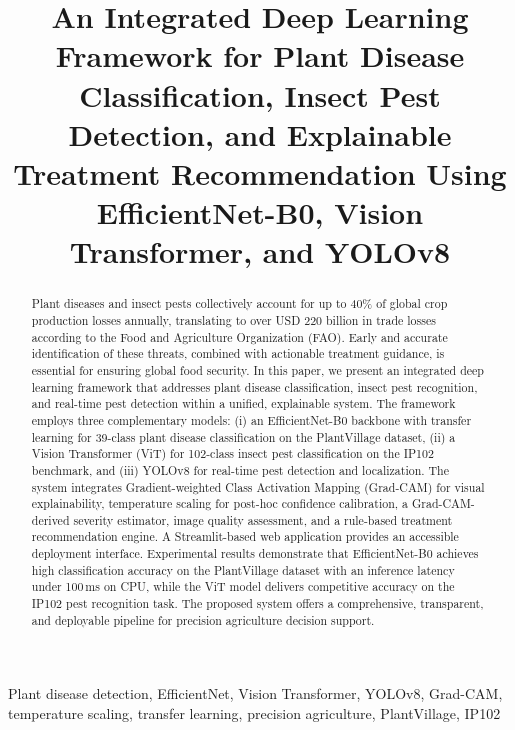 \documentclass[conference]{IEEEtran}
\begin{document}
\title{An Integrated Deep Learning Framework for Plant Disease Classification, Insect Pest Detection, and Explainable Treatment Recommendation Using EfficientNet-B0, Vision Transformer, and YOLOv8}

\author{
}

\maketitle

\begin{abstract}
Plant diseases and insect pests collectively account for up to 40\% of global crop production losses annually, translating to over USD 220 billion in trade losses according to the Food and Agriculture Organization (FAO). Early and accurate identification of these threats, combined with actionable treatment guidance, is essential for ensuring global food security. In this paper, we present an integrated deep learning framework that addresses plant disease classification, insect pest recognition, and real-time pest detection within a unified, explainable system. The framework employs three complementary models: (i) an EfficientNet-B0 backbone with transfer learning for 39-class plant disease classification on the PlantVillage dataset, (ii) a Vision Transformer (ViT) for 102-class insect pest classification on the IP102 benchmark, and (iii) YOLOv8 for real-time pest detection and localization. The system integrates Gradient-weighted Class Activation Mapping (Grad-CAM) for visual explainability, temperature scaling for post-hoc confidence calibration, a Grad-CAM-derived severity estimator, image quality assessment, and a rule-based treatment recommendation engine. A Streamlit-based web application provides an accessible deployment interface. Experimental results demonstrate that EfficientNet-B0 achieves high classification accuracy on the PlantVillage dataset with an inference latency under 100\,ms on CPU, while the ViT model delivers competitive accuracy on the IP102 pest recognition task. The proposed system offers a comprehensive, transparent, and deployable pipeline for precision agriculture decision support.
\end{abstract}

\begin{IEEEkeywords}
Plant disease detection, EfficientNet, Vision Transformer, YOLOv8, Grad-CAM, temperature scaling, transfer learning, precision agriculture, PlantVillage, IP102
\end{IEEEkeywords}
\end{document}
